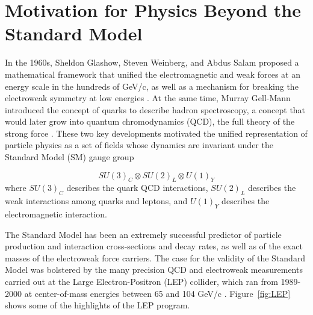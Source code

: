 \documentclass[dissertation.tex]{subfiles}
\begin{document}
\chapter{Motivation for Physics Beyond the Standard Model}
\label{chap:Motivation for Physics Beyond the Standard Model}

In the 1960s, Sheldon Glashow, Steven Weinberg, and Abdus Salam proposed a mathematical framework that unified the electromagnetic and weak forces at an energy scale in the hundreds of GeV/c, as well as a mechanism for breaking the electroweak symmetry at low energies \cite{Glashow_Weinberg_and_Salam}.  At the same time, Murray Gell-Mann introduced the concept of quarks to describe hadron spectroscopy, a concept that would later grow into quantum chromodynamics (QCD), the full theory of the strong force \cite{Gell-Mann}.  These two key developments motivated the unified representation of particle physics as a set of fields whose dynamics are invariant under the Standard Model (SM) gauge group

\begin{equation}
SU(3)_{C} \otimes SU(2)_{L} \otimes U(1)_{Y}
\end{equation}
%
where $SU(3)_{C}$ describes the quark QCD interactions, $SU(2)_{L}$ describes the weak interactions among quarks and leptons, and $U(1)_{Y}$ describes the electromagnetic interaction.

The Standard Model has been an extremely successful predictor of particle production and interaction cross-sections and decay rates, as well as of the exact masses of the electroweak force carriers.  The case for the validity of the Standard Model was bolstered by the many precision QCD and electroweak measurements carried out at the Large Electron-Positron (LEP) collider, which ran from 1989-2000 at center-of-mass energies between 65 and 104 GeV/c \cite{Drees}.  Figure~\ref{fig:LEP} shows some of the highlights of the LEP program.
\end{document}
